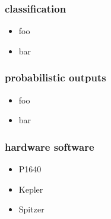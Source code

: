 \documentclass[pdftex]{beamer}
\begin{document}
\begin{frame}
  \frametitle{classification}
  \begin{itemize}
  \item foo
  \item bar
  \end{itemize}
\end{frame}

\begin{frame}
  \frametitle{probabilistic outputs}
  \begin{itemize}
  \item foo
  \item bar
  \end{itemize}
\end{frame}

\begin{frame}
  \frametitle{hardware  software}
  \begin{itemize}
  \item P1640
  \item Kepler
  \item Spitzer
  \end{itemize}
\end{frame}
\end{document}
